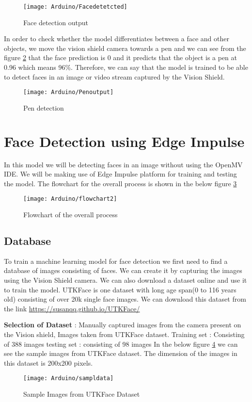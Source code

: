 \begin{figure}[H]
	\centering
	\texttt{[image: Arduino/Facedetetcted]}
	\caption{Face detection output}
	\label{figure 9.12}
\end{figure}
In order to check whether the model differentiates between a face and other objects, we move the vision shield camera towards a pen and  we can see from the figure \ref{figure 9.13} that the face prediction is 0 and it predicts that the object is a pen at 0.96 which means 96\%. Therefore, we can say that the model is trained to be able to detect faces in an image or video stream captured by the Vision Shield.
\begin{figure}[H]
	\centering
	\texttt{[image: Arduino/Penoutput]}
	\caption{Pen detection }
	\label{figure 9.13}
\end{figure}

\section{Face Detection using Edge Impulse}
In this model we will be detecting faces in an image without using the OpenMV IDE. We will be making use of Edge Impulse platform for training and testing the model.
The flowchart for the overall process is shown in the below figure \ref{figure 9.14} 
\begin{figure}[H]
	\centering
	\texttt{[image: Arduino/flowchart2]}
	\caption{Flowchart of the overall process }
	\label{figure 9.14}
\end{figure}

\subsection{Database}  To train a machine learning model for face detection we first need to find a database of images consisting of faces.  We can  create it by capturing the images using the Vision Shield camera. We can also download a dataset online and use it to train the model.  UTKFace  is one dataset with long age span(0 to 116 years old) consisting of over 20k single face images. We can download this dataset from the link \url{https://susanqq.github.io/UTKFace/}

\textbf{Selection of Dataset} : Manually captured images from the camera present on the Vision shield, Images taken from UTKFace dataset.
Training set : Consisting of 388 images
testing set : consisting of 98 images
In the below figure \ref{figure 9.115} we can see the sample images from UTKFace dataset. The dimension of the images in this dataset is 200x200 pixels. 
\begin{figure}[H]
	\centering
	\texttt{[image: Arduino/sampldata]}
	\caption{Sample Images from UTKFace Dataset  }
	\label{figure 9.115}
\end{figure}



